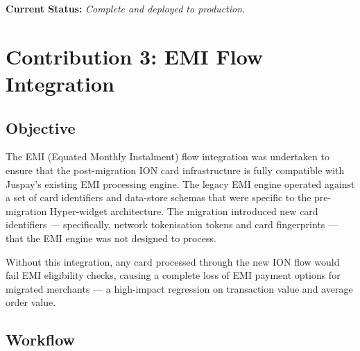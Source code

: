 \noindent \textbf{Current Status:} \textit{Complete and deployed to production.}

\section{Contribution 3: EMI Flow Integration}

\subsection{Objective}

The EMI (Equated Monthly Instalment) flow integration was undertaken to ensure that the post-migration ION card infrastructure is fully compatible with Juspay's existing EMI processing engine. The legacy EMI engine operated against a set of card identifiers and data-store schemas that were specific to the pre-migration Hyper-widget architecture. The migration introduced new card identifiers --- specifically, network tokenisation tokens and card fingerprints --- that the EMI engine was not designed to process.

\par Without this integration, any card processed through the new ION flow would fail EMI eligibility checks, causing a complete loss of EMI payment options for migrated merchants --- a high-impact regression on transaction value and average order value.

\subsection{Workflow}

